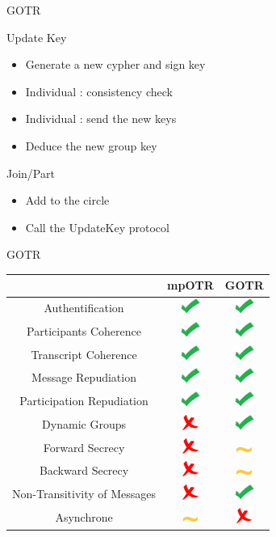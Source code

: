 \documentclass{beamer}
\newcommand{\okay}{\includegraphics[height=0.5cm]{img/check.png}}
\newcommand{\nope}{\includegraphics[height=0.5cm]{img/cross.png}}
\newcommand{\sortof}{\includegraphics[width=0.5cm]{img/tilde.png}}
\begin{document}
\begin{frame}{GOTR}

	\begin{block}{Update Key}
		\begin{itemize}
			\item Generate a new cypher and sign key
			\item Individual : consistency check
			\item Individual : send the new keys
			\item Deduce the new group key
		\end{itemize}
  \end{block}

	\begin{block}{Join/Part}
		\begin{itemize}
			\item Add to the circle
			\item Call the UpdateKey protocol
		\end{itemize}
  \end{block}
\end{frame}

\begin{frame}{GOTR}
	\center
  	\begin{tabular}{c|cc}
			 & mpOTR & GOTR\\
			\hline
  		Authentification & \okay & \okay \\
  		\hline
  		Participants Coherence & \okay & \okay \\
  		Transcript Coherence & \okay & \okay \\
  		\hline
  		Message Repudiation & \okay & \okay \\
  		Participation Repudiation & \okay & \okay \\
  		\hline
  		Dynamic Groups & \nope & \okay \\
  		\hline
  		Forward Secrecy & \nope & \sortof \\
  		Backward Secrecy & \nope & \sortof \\
  		Non-Transitivity of Messages & \nope & \okay \\
  		\hline
  		Asynchrone & \sortof & \nope 
    \end{tabular}
\end{frame}
\end{document}
